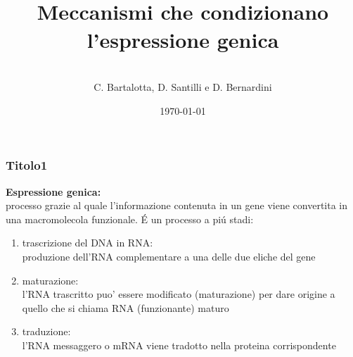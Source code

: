 \documentclass[hyperref={pdfpagelabels=false}]{beamer}
\title{\\Meccanismi che condizionano l'espressione genica\\}
\author{\\ C. Bartalotta, D. Santilli e D. Bernardini}
\date{\today}
\begin{document}


\begin{frame}
\titlepage
\end{frame} 


\begin{frame}\frametitle{Titolo1}
\textbf{Espressione genica:}\\
processo grazie al quale l'informazione contenuta in un gene viene convertita in una macromolecola funzionale.
\'E un processo a pi\'u stadi:\pause 
\begin{enumerate}
\item trascrizione del DNA in RNA:\\
produzione dell'RNA complementare a una delle due eliche del gene  \pause 
\item maturazione:\\
l'RNA trascritto puo' essere modificato (maturazione) per dare origine a quello che si chiama RNA (funzionante) maturo \pause 
\item traduzione:\\
l'RNA messaggero o mRNA viene tradotto nella proteina corrispondente
\end{enumerate}
\end{frame}
\end{document}
